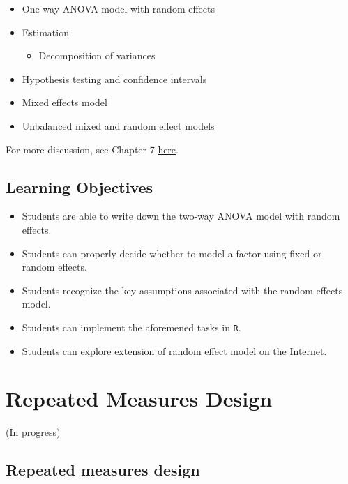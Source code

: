 \documentclass[12pt,]{book}
\providecommand{\tightlist}{%
  \setlength{\itemsep}{0pt}\setlength{\parskip}{0pt}}
\begin{document}
\begin{itemize}
\tightlist
\item
  One-way ANOVA model with random effects
\item
  Estimation

  \begin{itemize}
  \tightlist
  \item
    Decomposition of variances
  \end{itemize}
\item
  Hypothesis testing and confidence intervals
\item
  Mixed effects model
\item
  Unbalanced mixed and random effect models
\end{itemize}

For more discussion, see Chapter 7
\href{https://stat.ethz.ch/~meier/teaching/anova/random-and-mixed-effects-models.html}{here}.

\section{Learning Objectives}\label{learning-objectives-3}

\begin{itemize}
\tightlist
\item
  Students are able to write down the two-way ANOVA model with random
  effects.
\item
  Students can properly decide whether to model a factor using fixed or
  random effects.
\item
  Students recognize the key assumptions associated with the random
  effects model.
\item
  Students can implement the aforemened tasks in \texttt{R}.
\item
  Students can explore extension of random effect model on the Internet.
\end{itemize}

\chapter{Repeated Measures Design}\label{ch:repeated}

(In progress)

\section{Repeated measures design}\label{repeated-measures-design}
\end{document}
